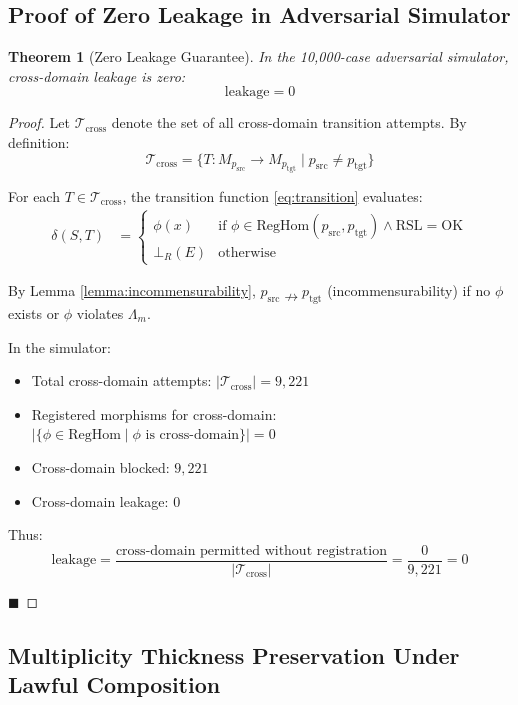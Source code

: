 \documentclass[11pt,a4paper]{article}
\newtheorem{theorem}{Theorem}[section]
\begin{document}
\subsection{Proof of Zero Leakage in Adversarial Simulator}

\begin{theorem}[Zero Leakage Guarantee]\label{thm:zero_leakage}
In the 10,000-case adversarial simulator, cross-domain leakage is zero:
$$\text{leakage} = 0$$
\end{theorem}

\begin{proof}
Let $\mathcal{T}_{\text{cross}}$ denote the set of all cross-domain transition attempts. By definition:
$$\mathcal{T}_{\text{cross}} = \{T: M_{p_{\text{src}}} \to M_{p_{\text{tgt}}} \mid p_{\text{src}} \neq p_{\text{tgt}}\}$$

For each $T \in \mathcal{T}_{\text{cross}}$, the transition function \eqref{eq:transition} evaluates:
\begin{align}
\delta(S, T) &= \begin{cases}
\phi(x) & \text{if } \phi \in \text{RegHom}(p_{\text{src}}, p_{\text{tgt}}) \land \text{RSL} = \text{OK} \\
\bot_R(E) & \text{otherwise}
\end{cases}
\end{align}

By Lemma \ref{lemma:incommensurability}, $p_{\text{src}} \nrightarrow p_{\text{tgt}}$ (incommensurability) if no $\phi$ exists or $\phi$ violates $\Lambda_m$.

In the simulator:
\begin{itemize}
    \item Total cross-domain attempts: $|\mathcal{T}_{\text{cross}}| = 9,221$
    \item Registered morphisms for cross-domain: $|\{\phi \in \text{RegHom} \mid \phi \text{ is cross-domain}\}| = 0$
    \item Cross-domain blocked: $9,221$
    \item Cross-domain leakage: $0$
\end{itemize}

Thus:
$$\text{leakage} = \frac{\text{cross-domain permitted without registration}}{|\mathcal{T}_{\text{cross}}|} = \frac{0}{9,221} = 0$$

\hfill $\blacksquare$
\end{proof}

\subsection{Multiplicity Thickness Preservation Under Lawful Composition}
\end{document}
